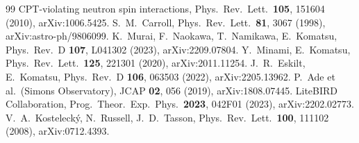 \documentclass[11pt]{article}
\begin{document}
\begin{thebibliography}{99}
{  CPT-violating neutron spin interactions}, Phys.\ Rev.\ Lett.\ \textbf{105}, 151604 (2010), arXiv:1006.5425.
 S.~M.~Carroll, Phys.\ Rev.\ Lett.\ \textbf{81}, 3067 (1998),
  arXiv:astro-ph/9806099.
 K.~Murai, F.~Naokawa, T.~Namikawa, E.~Komatsu, Phys.\ Rev.\ D
  \textbf{107}, L041302 (2023), arXiv:2209.07804.
 Y.~Minami, E.~Komatsu, Phys.\ Rev.\ Lett.\ \textbf{125}, 221301 (2020),
  arXiv:2011.11254.
 J.~R.~Eskilt, E.~Komatsu, Phys.\ Rev.\ D \textbf{106}, 063503 (2022),
  arXiv:2205.13962.
 P.~Ade et al.\ (Simons Observatory), JCAP \textbf{02}, 056 (2019),
  arXiv:1808.07445.
 LiteBIRD Collaboration, Prog.\ Theor.\ Exp.\ Phys.\ \textbf{2023},
  042F01 (2023), arXiv:2202.02773.
 V.~A.~Kosteleck\'y, N.~Russell, J.~D.~Tasson, Phys.\ Rev.\ Lett.\
  \textbf{100}, 111102 (2008), arXiv:0712.4393.
\end{thebibliography}
\end{document}
